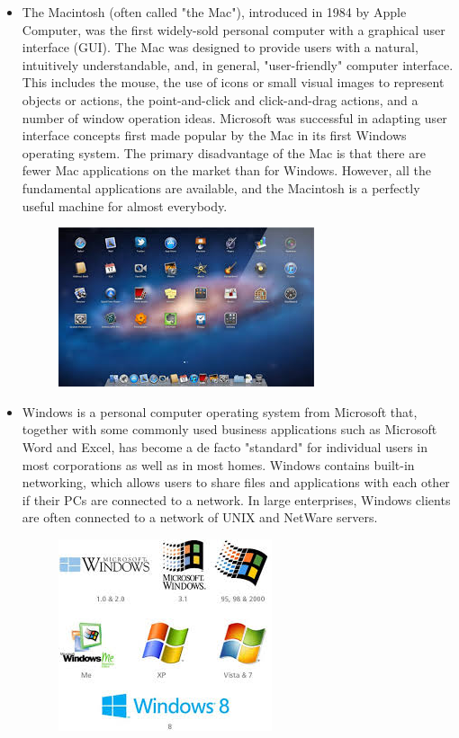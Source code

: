 \documentclass[11pt,a4paper]{article}
\begin{document}
\begin{itemize}
		\item The Macintosh (often called "the Mac"), introduced in 1984 by Apple Computer, was the first widely-sold personal computer with a graphical user interface (GUI). The Mac was designed to provide users with a natural, intuitively understandable, and, in general, "user-friendly" computer interface. This includes the mouse, the use of icons or small visual images to represent objects or actions, the point-and-click and click-and-drag actions, and a number of window operation ideas. Microsoft was successful in adapting user interface concepts first made popular by the Mac in its first Windows operating system. The primary disadvantage of the Mac is that there are fewer Mac applications on the market than for Windows. However, all the fundamental applications are available, and the Macintosh is a perfectly useful machine for almost everybody.
			\begin{figure}
				\includegraphics{mac.jpg}
				\centering
			\end{figure} 
		\newpage
		\item Windows is a personal computer operating system from Microsoft that, together with some commonly used business applications such as Microsoft Word and Excel, has become a de facto "standard" for individual users in most corporations as well as in most homes. Windows contains built-in networking, which allows users to share files and applications with each other if their PCs are connected to a network. In large enterprises, Windows clients are often connected to a network of UNIX and NetWare servers.
			\begin{figure}[h!]
				\includegraphics{windows.jpg}

\end{figure}
\end{itemize}
\end{document}
